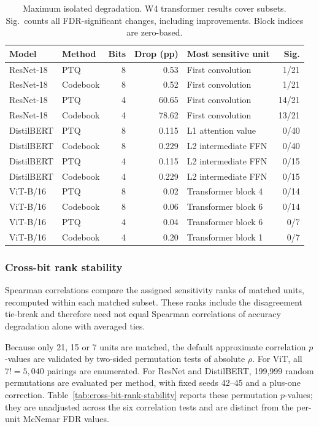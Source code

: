 \documentclass[conference]{IEEEtran}
\begin{document}
\begin{table}[!t]
\centering
\caption{Maximum isolated degradation. W4 transformer results cover subsets. Sig.\ counts all FDR-significant changes, including improvements. Block indices are zero-based.}
\label{tab:isolated-sensitivity-summary}
\scriptsize
\setlength{\tabcolsep}{2pt}
\begin{tabular}{@{}llrrlr@{}}
\toprule
Model & Method & Bits & Drop (pp) & Most sensitive unit & Sig. \\
\midrule
ResNet-18 & PTQ & 8 & 0.53 & First convolution & 1/21 \\
ResNet-18 & Codebook & 8 & 0.52 & First convolution & 1/21 \\
ResNet-18 & PTQ & 4 & 60.65 & First convolution & 14/21 \\
ResNet-18 & Codebook & 4 & 78.62 & First convolution & 13/21 \\
\midrule
DistilBERT & PTQ & 8 & 0.115 & L1 attention value & 0/40 \\
DistilBERT & Codebook & 8 & 0.229 & L2 intermediate FFN & 0/40 \\
DistilBERT & PTQ & 4 & 0.115 & L2 intermediate FFN & 0/15 \\
DistilBERT & Codebook & 4 & 0.229 & L2 intermediate FFN & 0/15 \\
\midrule
ViT-B/16 & PTQ & 8 & 0.02 & Transformer block 4 & 0/14 \\
ViT-B/16 & Codebook & 8 & 0.06 & Transformer block 6 & 0/14 \\
ViT-B/16 & PTQ & 4 & 0.04 & Transformer block 6 & 0/7 \\
ViT-B/16 & Codebook & 4 & 0.20 & Transformer block 1 & 0/7 \\
\bottomrule
\end{tabular}
\end{table}

\subsubsection{Cross-bit rank stability}

Spearman correlations compare the assigned sensitivity ranks of matched units, recomputed within each matched subset. These ranks include the disagreement tie-break and therefore need not equal Spearman correlations of accuracy degradation alone with averaged ties.

Because only 21, 15 or 7 units are matched, the default approximate correlation $p$-values are validated by two-sided permutation tests of absolute $\rho$. For ViT, all $7!=5{,}040$ pairings are enumerated. For ResNet and DistilBERT, 199,999 random permutations are evaluated per method, with fixed seeds 42--45 and a plus-one correction. Table~\ref{tab:cross-bit-rank-stability} reports these permutation $p$-values; they are unadjusted across the six correlation tests and are distinct from the per-unit McNemar FDR values.
\end{document}
